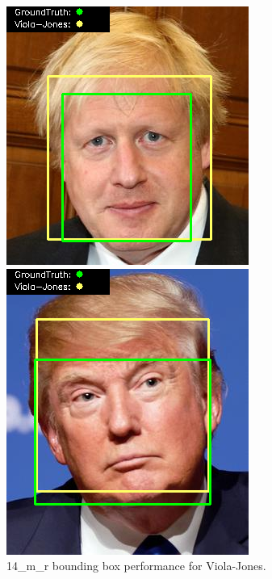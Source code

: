 \documentclass{l4proj}
\begin{document}
\begin{appendices}
\begin{figure}[h!]
  \centering
  \begin{minipage}{0.49\textwidth}
    \centering
     \includegraphics[width=\textwidth]{images/appendix/viola/14.png}
    \caption{14\_m\_r bounding box performance for Viola-Jones.}
    \label{whoopi_result}
  \end{minipage}
    \hfill
    \begin{minipage}{0.49\textwidth}
    \centering
     \includegraphics[width=\textwidth]{images/appendix/viola/15.png}

\end{minipage}
\end{figure}
\end{appendices}
\end{document}
